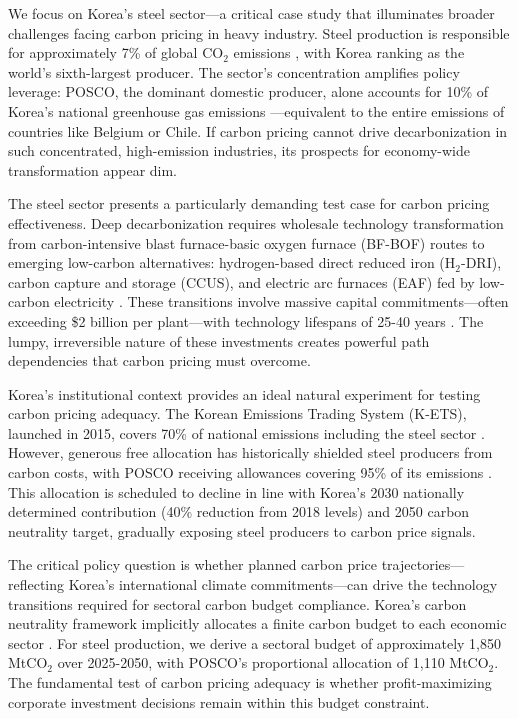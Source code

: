 \documentclass[preprint,5p,authoryear]{elsarticle}
\begin{document}
We focus on Korea's steel sector—a critical case study that illuminates broader challenges facing carbon pricing in heavy industry. Steel production is responsible for approximately 7\% of global CO$_2$ emissions \citep{worldsteel2022}, with Korea ranking as the world's sixth-largest producer. The sector's concentration amplifies policy leverage: POSCO, the dominant domestic producer, alone accounts for 10\% of Korea's national greenhouse gas emissions \citep{kosis2023}—equivalent to the entire emissions of countries like Belgium or Chile. If carbon pricing cannot drive decarbonization in such concentrated, high-emission industries, its prospects for economy-wide transformation appear dim.

The steel sector presents a particularly demanding test case for carbon pricing effectiveness. Deep decarbonization requires wholesale technology transformation from carbon-intensive blast furnace-basic oxygen furnace (BF-BOF) routes to emerging low-carbon alternatives: hydrogen-based direct reduced iron (H$_2$-DRI), carbon capture and storage (CCUS), and electric arc furnaces (EAF) fed by low-carbon electricity \citep{IEA2020steel}. These transitions involve massive capital commitments—often exceeding \$2 billion per plant—with technology lifespans of 25-40 years \citep{materialeconomics2019}. The lumpy, irreversible nature of these investments creates powerful path dependencies that carbon pricing must overcome.

Korea's institutional context provides an ideal natural experiment for testing carbon pricing adequacy. The Korean Emissions Trading System (K-ETS), launched in 2015, covers 70\% of national emissions including the steel sector \citep{kim2021kets}. However, generous free allocation has historically shielded steel producers from carbon costs, with POSCO receiving allowances covering 95\% of its emissions \citep{icap2024korea}. This allocation is scheduled to decline in line with Korea's 2030 nationally determined contribution (40\% reduction from 2018 levels) and 2050 carbon neutrality target, gradually exposing steel producers to carbon price signals.

The critical policy question is whether planned carbon price trajectories—reflecting Korea's international climate commitments—can drive the technology transitions required for sectoral carbon budget compliance. Korea's carbon neutrality framework implicitly allocates a finite carbon budget to each economic sector \citep{korea2020carbon}. For steel production, we derive a sectoral budget of approximately 1,850 MtCO$_2$ over 2025-2050, with POSCO's proportional allocation of 1,110 MtCO$_2$. The fundamental test of carbon pricing adequacy is whether profit-maximizing corporate investment decisions remain within this budget constraint.
\end{document}
